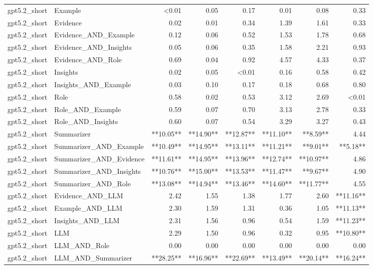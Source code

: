 \begin{tabular}{llrrrrrr}
gpt5.2_short & Example & <0.01 & 0.05 & 0.17 & 0.01 & 0.08 & 0.33 \\
gpt5.2_short & Evidence & 0.02 & 0.01 & 0.34 & 1.39 & 1.61 & 0.33 \\
gpt5.2_short & Evidence_AND_Example & 0.12 & 0.06 & 0.52 & 1.53 & 1.78 & 0.68 \\
gpt5.2_short & Evidence_AND_Insights & 0.05 & 0.06 & 0.35 & 1.58 & 2.21 & 0.93 \\
gpt5.2_short & Evidence_AND_Role & 0.69 & 0.04 & 0.92 & 4.57 & 4.33 & 0.37 \\
gpt5.2_short & Insights & 0.02 & 0.05 & <0.01 & 0.16 & 0.58 & 0.42 \\
gpt5.2_short & Insights_AND_Example & 0.03 & 0.10 & 0.17 & 0.18 & 0.68 & 0.80 \\
gpt5.2_short & Role & 0.58 & 0.02 & 0.53 & 3.12 & 2.69 & <0.01 \\
gpt5.2_short & Role_AND_Example & 0.59 & 0.07 & 0.70 & 3.13 & 2.78 & 0.33 \\
gpt5.2_short & Role_AND_Insights & 0.60 & 0.07 & 0.54 & 3.29 & 3.27 & 0.43 \\
gpt5.2_short & Summarizer & **10.05** & **14.90** & **12.87** & **11.10** & **8.59** & 4.44 \\
gpt5.2_short & Summarizer_AND_Example & **10.49** & **14.95** & **13.11** & **11.21** & **9.01** & **5.18** \\
gpt5.2_short & Summarizer_AND_Evidence & **11.61** & **14.95** & **13.96** & **12.74** & **10.97** & 4.86 \\
gpt5.2_short & Summarizer_AND_Insights & **10.76** & **15.00** & **13.53** & **11.47** & **9.67** & 4.90 \\
gpt5.2_short & Summarizer_AND_Role & **13.08** & **14.94** & **13.46** & **14.60** & **11.77** & 4.55 \\
gpt5.2_short & Evidence_AND_LLM & 2.42 & 1.55 & 1.38 & 1.77 & 2.60 & **11.16** \\
gpt5.2_short & Example_AND_LLM & 2.30 & 1.59 & 1.31 & 0.36 & 1.05 & **11.13** \\
gpt5.2_short & Insights_AND_LLM & 2.31 & 1.56 & 0.96 & 0.54 & 1.59 & **11.23** \\
gpt5.2_short & LLM & 2.29 & 1.50 & 0.96 & 0.32 & 0.95 & **10.80** \\
gpt5.2_short & LLM_AND_Role & 0.00 & 0.00 & 0.00 & 0.00 & 0.00 & 0.00 \\
gpt5.2_short & LLM_AND_Summarizer & **28.25** & **16.96** & **22.69** & **13.49** & **20.14** & **16.24** \\

\end{tabular}
